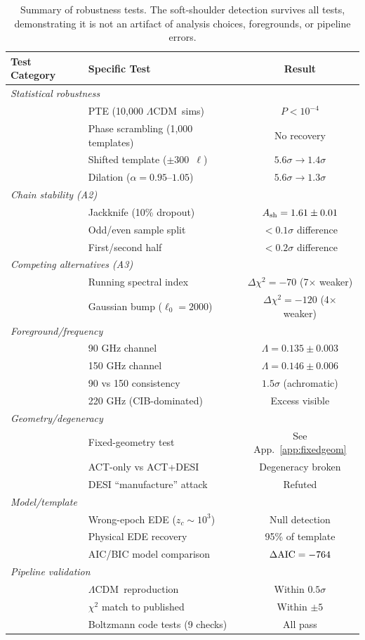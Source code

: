 \documentclass[twocolumn,showpacs,preprintnumbers,amsmath,amssymb,prd]{revtex4-2}
\newcommand{\lcdm}{$\Lambda$CDM}
\begin{document}
\begin{table}[t]
\centering
\caption{Summary of robustness tests. The soft-shoulder detection 
survives all tests, demonstrating it is not an artifact of analysis 
choices, foregrounds, or pipeline errors.}
\begin{tabular}{llc}
\toprule
Test Category & Specific Test & Result \\
\midrule
\multicolumn{3}{l}{\textit{Statistical robustness}} \\
& PTE (10,000 \lcdm\ sims) & $P < 10^{-4}$ \\
& Phase scrambling (1,000 templates) & No recovery \\
& Shifted template ($\pm 300$~$\ell$) & $5.6\sigma \to 1.4\sigma$ \\
& Dilation ($\alpha = 0.95$--$1.05$) & $5.6\sigma \to 1.3\sigma$ \\
\midrule
\multicolumn{3}{l}{\textit{Chain stability (A2)}} \\
& Jackknife (10\% dropout) & $A_{\rm sh} = 1.61 \pm 0.01$ \\
& Odd/even sample split & $< 0.1\sigma$ difference \\
& First/second half & $< 0.2\sigma$ difference \\
\midrule
\multicolumn{3}{l}{\textit{Competing alternatives (A3)}} \\
& Running spectral index & $\Delta\chi^2 = -70$ (7$\times$ weaker) \\
& Gaussian bump ($\ell_0 = 2000$) & $\Delta\chi^2 = -120$ (4$\times$ weaker) \\
\midrule
\multicolumn{3}{l}{\textit{Foreground/frequency}} \\
& 90 GHz channel & $\Lambda = 0.135 \pm 0.003$ \\
& 150 GHz channel & $\Lambda = 0.146 \pm 0.006$ \\
& 90 vs 150 consistency & $1.5\sigma$ (achromatic) \\
& 220 GHz (CIB-dominated) & Excess visible \\
\midrule
\multicolumn{3}{l}{\textit{Geometry/degeneracy}} \\
& Fixed-geometry test & See App.~\ref{app:fixedgeom} \\
& ACT-only vs ACT+DESI & Degeneracy broken \\
& DESI ``manufacture'' attack & Refuted \\
\midrule
\multicolumn{3}{l}{\textit{Model/template}} \\
& Wrong-epoch EDE ($z_c \sim 10^3$) & Null detection \\
& Physical EDE recovery & 95\% of template \\
& AIC/BIC model comparison & $\Delta\rm{AIC} = -764$ \\
\midrule
\multicolumn{3}{l}{\textit{Pipeline validation}} \\
& \lcdm\ reproduction & Within $0.5\sigma$ \\
& $\chi^2$ match to published & Within $\pm 5$ \\
& Boltzmann code tests (9 checks) & All pass \\
\bottomrule
\end{tabular}
\label{tab:robustness_summary}
\end{table}
\end{document}
